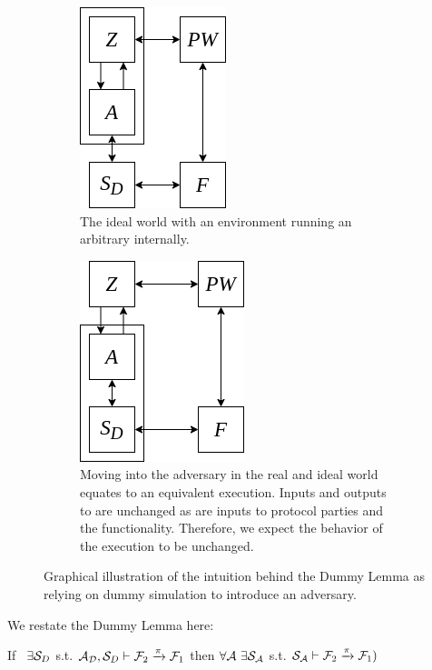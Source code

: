 \begin{figure}
	\begin{subfigure}[t]{0.45\textwidth}
	\centering
	\includegraphics[scale=0.5]{figures/dummylemma_pre.png}
	\caption{The ideal world with an environment running an arbitrary \A internally.}
	\label{fig:dummy_pre}
	\end{subfigure}
	\hspace{2mm}
	\begin{subfigure}[t]{0.45\textwidth}
	\centering
	\includegraphics[scale=0.5]{figures/dummylemma_post.png}
	\caption{Moving \A into the adversary in the real and ideal world equates to an equivalent execution. Inputs and outputs to \DS are unchanged as are inputs to protocol parties and the functionality. Therefore, we expect the behavior of the execution to be unchanged.}
	\label{fig:dummy_post}
	\end{subfigure}
	\caption{Graphical illustration of the intuition behind the Dummy Lemma as relying on dummy simulation to introduce an adversary.}
	\label{fig:dummylemmas}
\end{figure}


We restate the Dummy Lemma here:
\begin{theorem}\label{thm:dummy}
If \ $\exists \mathcal{S}_{D}$ s.t. $ \mathcal{A}_\mathcal{D}, \mathcal{S}_{D} \vdash \mathcal{F}_2 \xrightarrow{\pi} \mathcal{F}_1$ then $\forall \mathcal{A} \ \exists \mathcal{S}_\mathcal{A}$ s.t. $\mathcal{S}_{\mathcal{A}} \vdash  \mathcal{F}_2 \xrightarrow{\pi} \mathcal{F}_1)$ 
\end{theorem}

